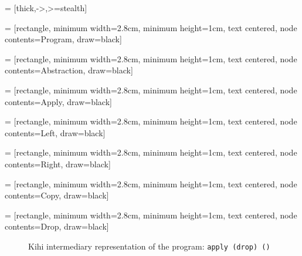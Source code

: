  = [thick,->,>=stealth]

 = [rectangle, minimum width=2.8cm, minimum height=1cm, text centered, node contents=Program, draw=black]

 = [rectangle, minimum width=2.8cm, minimum height=1cm, text centered, node contents=Abstraction, draw=black]

 = [rectangle, minimum width=2.8cm, minimum height=1cm, text centered, node contents=Apply, draw=black]

 = [rectangle, minimum width=2.8cm, minimum height=1cm, text centered, node contents=Left, draw=black]

 = [rectangle, minimum width=2.8cm, minimum height=1cm, text centered, node contents=Right, draw=black]

 = [rectangle, minimum width=2.8cm, minimum height=1cm, text centered, node contents=Copy, draw=black]

 = [rectangle, minimum width=2.8cm, minimum height=1cm, text centered, node contents=Drop, draw=black]

\begin{figure}[htb]
    \centering
    \caption{Kihi intermediary representation of the program: \lstinline{apply (drop) ()}}
    \label{fig:kihi_intermediary_representation_example}
\end{figure}


